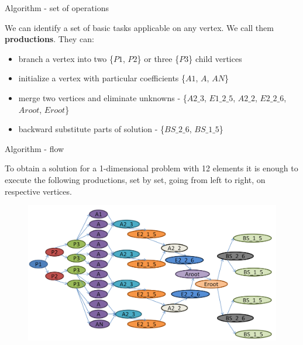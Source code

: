 \documentclass[c]{beamer}
\begin{document}

\begin{frame}{Algorithm - set of operations}

We can identify a set of basic tasks applicable on any vertex. We call them \textbf{productions}. They can:
\begin{itemize}
  \item branch a vertex into two \{$P1$, $P2$\} or three \{$P3$\} child vertices
  \item initialize a vertex with particular coefficients \{$A1$, $A$, $AN$\}
  \item merge two vertices and eliminate unknowns -  \{$A2\_3$, $E1\_2\_5$, $A2\_2$, $E2\_2\_6$, $Aroot$, $Eroot$\} 
  \item backward substitute parts of solution - \{$BS\_2\_6$, $BS\_1\_5$\}
\end{itemize}

\end{frame}


\begin{frame}{Algorithm - flow}

To obtain a solution for a 1-dimensional problem with 12 elements it is enough to execute the following productions, set by set, going from left to right, on respective vertices.

	\begin{figure}
      \centering
      \includegraphics[width=1\textwidth]{img/task_tree}
    \end{figure}

\end{frame}

\end{document}
